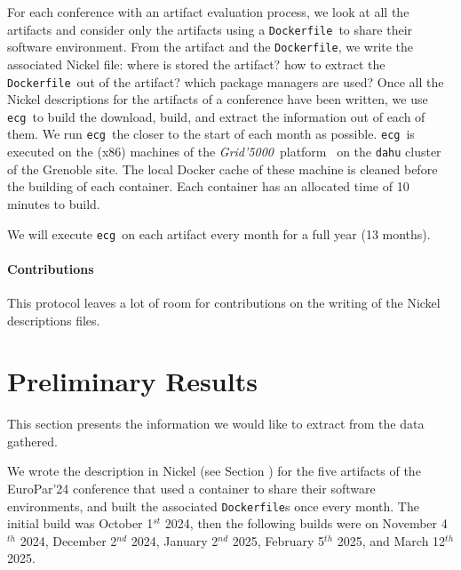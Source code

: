 \documentclass[sigconf,natbib=false]{acmart}
\newcommand{\grid}{\emph{Grid'5000}}
\newcommand{\df}{\texttt{Dockerfile}}
\newcommand{\ecg}{\texttt{ecg}}
\newcommand{\todo}[1]{{\color{red}{TODO: #1}}}
\begin{document}
For each conference with an artifact evaluation process, we look at all the artifacts and consider only the artifacts using a \df\ to share their software environment.
From the artifact and the \df, we write the associated Nickel file: where is stored the artifact? how to extract the \df\ out of the artifact? which package managers are used?
Once all the Nickel descriptions for the artifacts of a conference have been written, we use \ecg\ to build the download, build, and extract the information out of each of them.
We run \ecg\ the closer to the start of each month as possible.
\ecg\ is executed on the (x86) machines of the \grid\ platform~\cite{grid5000} on the \texttt{dahu} cluster of the Grenoble site.
The local Docker cache of these machine is cleaned before the building of each container.
Each container has an allocated time of 10 minutes to build.

We will execute \ecg\ on each artifact every month for a full year (13 months).

\paragraph{Contributions}

This protocol leaves a lot of room for contributions on the writing of the Nickel descriptions files.

% 

\section{Preliminary Results}

This section presents the information we would like to extract from the data gathered.


We wrote the description in Nickel (see Section \todo{}) for the five artifacts of the EuroPar'24 conference that used a container to share their software environments, and built the associated \df s once every month.
The initial build was October 1$^{st}$ 2024, then the following builds were on November 4$^{th}$ 2024, December 2$^{nd}$ 2024, January 2$^{nd}$ 2025, February 5$^{th}$ 2025, and March 12$^{th}$ 2025.
\todo{when was the artifact submission, and publicaiton of the papers for europar?}
\end{document}
